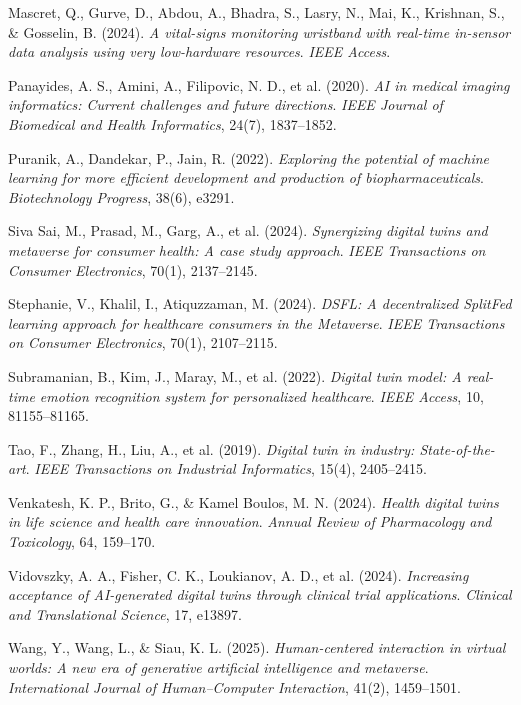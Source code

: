\documentclass[10pt,a4paper]{article}
\begin{document}
\begin{thebibliography}{99}
Mascret, Q., Gurve, D., Abdou, A., Bhadra, S., Lasry, N., Mai, K., Krishnan, S., \& Gosselin, B. (2024).  
\textit{A vital-signs monitoring wristband with real-time in-sensor data analysis using very low-hardware resources}.  
\textit{IEEE Access}.

Panayides, A. S., Amini, A., Filipovic, N. D., et al. (2020).  
\textit{AI in medical imaging informatics: Current challenges and future directions}.  
\textit{IEEE Journal of Biomedical and Health Informatics}, 24(7), 1837--1852.

Puranik, A., Dandekar, P., Jain, R. (2022).  
\textit{Exploring the potential of machine learning for more efficient development and production of biopharmaceuticals}.  
\textit{Biotechnology Progress}, 38(6), e3291.

Siva Sai, M., Prasad, M., Garg, A., et al. (2024).  
\textit{Synergizing digital twins and metaverse for consumer health: A case study approach}.  
\textit{IEEE Transactions on Consumer Electronics}, 70(1), 2137--2145.

Stephanie, V., Khalil, I., Atiquzzaman, M. (2024).  
\textit{DSFL: A decentralized SplitFed learning approach for healthcare consumers in the Metaverse}.  
\textit{IEEE Transactions on Consumer Electronics}, 70(1), 2107--2115.

Subramanian, B., Kim, J., Maray, M., et al. (2022).  
\textit{Digital twin model: A real-time emotion recognition system for personalized healthcare}.  
\textit{IEEE Access}, 10, 81155--81165.

Tao, F., Zhang, H., Liu, A., et al. (2019).  
\textit{Digital twin in industry: State-of-the-art}.  
\textit{IEEE Transactions on Industrial Informatics}, 15(4), 2405--2415.

Venkatesh, K. P., Brito, G., \& Kamel Boulos, M. N. (2024).  
\textit{Health digital twins in life science and health care innovation}.  
\textit{Annual Review of Pharmacology and Toxicology}, 64, 159--170.

Vidovszky, A. A., Fisher, C. K., Loukianov, A. D., et al. (2024).  
\textit{Increasing acceptance of AI-generated digital twins through clinical trial applications}.  
\textit{Clinical and Translational Science}, 17, e13897.

Wang, Y., Wang, L., \& Siau, K. L. (2025).  
\textit{Human-centered interaction in virtual worlds: A new era of generative artificial intelligence and metaverse}.  
\textit{International Journal of Human–Computer Interaction}, 41(2), 1459--1501.


\end{thebibliography}
\end{document}
